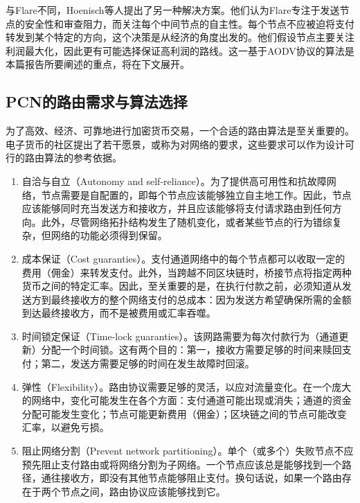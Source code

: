 \documentclass[12pt,a4paper]{article}
\begin{document}
与Flare不同，Hoenisch等人提出了另一种解决方案\cite{hoenisch2018aodv}。他们认为Flare专注于发送节点的安全性和审查阻力，而\cite{hoenisch2018aodv}关注每个中间节点的自主性。每个节点不应被迫将支付转发到某个特定的方向，这个决策是从经济的角度出发的。他们假设节点主要关注利润最大化，因此更有可能选择保证高利润的路线。这一基于AODV协议的算法是本篇报告所要阐述的重点，将在下文展开。

\subsection{PCN的路由需求与算法选择}
为了高效、经济、可靠地进行加密货币交易，一个合适的路由算法是至关重要的。电子货币的社区提出了若干愿景\cite{beliefs}，或称为对网络的要求，这些要求可以作为设计可行的路由算法的参考依据。

\begin{enumerate}
	\item 自洽与自立（Autonomy and self-reliance）。为了提供高可用性和抗故障网络，节点需要是自配置的，即每个节点应该能够独立自主地工作。因此，节点应该能够同时充当发送方和接收方，并且应该能够将支付请求路由到任何方向。此外，尽管网络拓扑结构发生了随机变化，或者某些节点的行为错综复杂，但网络的功能必须得到保留。

	\item 成本保证（Cost guaranties）。支付通道网络中的每个节点都可以收取一定的费用（佣金）来转发支付。此外，当跨越不同区块链时，桥接节点将指定两种货币之间的特定汇率。因此，至关重要的是，在执行付款之前，必须知道从发送方到最终接收方的整个网络支付的总成本：因为发送方希望确保所需的金额到达最终接收方，而不是被费用或汇率吞噬。

	\item 时间锁定保证（Time-lock guaranties）。该网路需要为每次付款行为（通道更新）分配一个时间锁。这有两个目的：第一，接收方需要足够的时间来赎回支付；第二，发送方需要足够的时间在发生故障时回滚。

	\item 弹性（Flexibility）。路由协议需要足够的灵活，以应对流量变化。在一个庞大的网络中，变化可能发生在各个方面：支付通道可能出现或消失；通道的资金分配可能发生变化；节点可能更新费用（佣金）；区块链之间的节点可能改变汇率，以避免亏损。

	\item 阻止网络分割（Prevent network partitioning）。单个（或多个）失败节点不应预先阻止支付路由或将网络分割为子网络。一个节点应该总是能够找到一个路径，通往接收方，即没有其他节点能够阻止支付。换句话说，如果一个路由存在于两个节点之间，路由协议应该能够找到它。


\end{enumerate}
\end{document}
